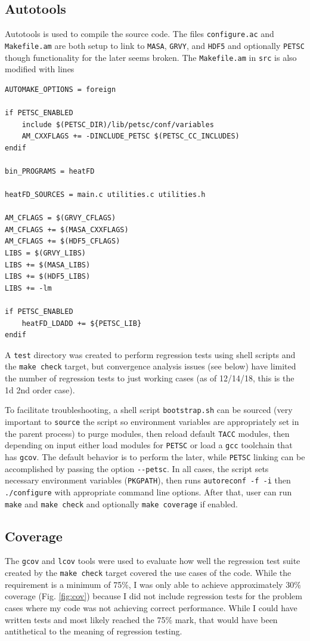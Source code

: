 \documentclass[letterpaper,12pt]{article}
\begin{document}
\subsection{Autotools}
Autotools is used to compile the source code. The files \verb|configure.ac| and \verb|Makefile.am| are both setup to link to \verb|MASA|, \verb|GRVY|, and \verb|HDF5| and optionally \verb|PETSC| though functionality for the later seems broken. The \verb|Makefile.am| in \verb|src| is also modified with lines
\begin{verbatim}
AUTOMAKE_OPTIONS = foreign

if PETSC_ENABLED
	include $(PETSC_DIR)/lib/petsc/conf/variables
	AM_CXXFLAGS += -DINCLUDE_PETSC $(PETSC_CC_INCLUDES)
endif

bin_PROGRAMS = heatFD

heatFD_SOURCES = main.c utilities.c utilities.h

AM_CFLAGS = $(GRVY_CFLAGS)
AM_CFLAGS += $(MASA_CXXFLAGS)
AM_CFLAGS += $(HDF5_CFLAGS)
LIBS = $(GRVY_LIBS)
LIBS += $(MASA_LIBS)
LIBS += $(HDF5_LIBS)
LIBS += -lm

if PETSC_ENABLED
	heatFD_LDADD += ${PETSC_LIB}
endif
\end{verbatim}
A \verb|test| directory was created to perform regression tests using shell scripts and the \verb|make check| target, but convergence analysis issues (see below) have limited the number of regression tests to just working cases (as of 12/14/18, this is the 1d 2nd order case).

To facilitate troubleshooting, a shell script \verb|bootstrap.sh| can be sourced (very important to \verb|source| the script so environment variables are appropriately set in the parent process) to purge modules, then reload default \verb|TACC| modules, then depending on input either load modules for \verb|PETSC| or load a \verb|gcc| toolchain that has \verb|gcov|. The default behavior is to perform the later, while \verb|PETSC| linking can be accomplished by passing the option \verb|--petsc|. In all cases, the script sets necessary environment variables (\verb|PKGPATH|), then runs \verb|autoreconf -f -i| then \verb|./configure| with appropriate command line options. After that, user can run \verb|make| and \verb|make check| and optionally \verb|make coverage| if enabled.

\subsection{Coverage}
The \verb|gcov| and \verb|lcov| tools were used to evaluate how well the regression test suite created by the \verb|make check| target covered the use cases of the code. While the requirement is a minimum of 75\%, I was only able to achieve  approximately 30\% coverage (Fig. \ref{fig:cov}) because I did not include regression tests for the problem cases where my code was not achieving correct performance. While I could have written tests and most likely reached the 75\% mark, that would have been antithetical to the meaning of regression testing.
\end{document}

